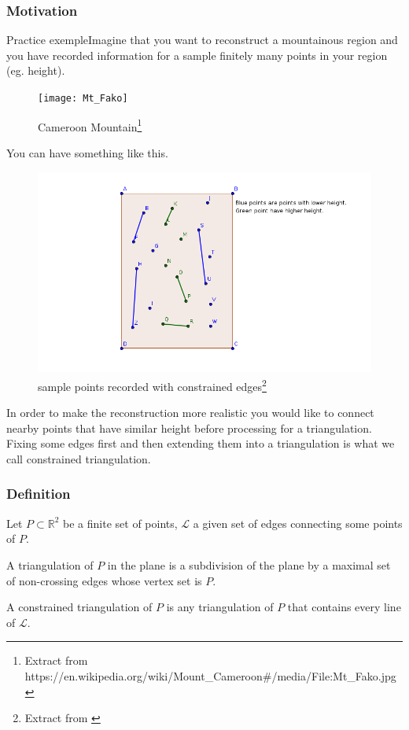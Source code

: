 \documentclass[10pt]{beamer}
\begin{document}
\begin{frame}
	\frametitle{Motivation}

\begin{block}{Practice exemple}Imagine that you want to reconstruct a mountainous region and you have recorded information for a sample finitely many points in your region (eg. height).\end{block}
		\begin{figure}[hH]\label{fig:mtfako}
			\centering
			\texttt{[image: Mt\_Fako]}
			\caption[Cameroon Mountain]{Cameroon Mountain\footnote{Extract from https://en.wikipedia.org/wiki/Mount\_Cameroon\#/media/File:Mt\_Fako.jpg}}%
	  		
		\end{figure}
\end{frame}
\begin{frame}
	You can have something like this.
	\begin{figure}[H]
		\centering
		\includegraphics[width=0.75\linewidth]{Sample}
		\caption[Sample points recorded]{sample points recorded with constrained edges\footnote{Extract from \cite{devadoss2011discrete}}}
		\label{fig:samplepoints}
	\end{figure}
	In order to make the reconstruction more realistic you would like to connect nearby points that have similar height before processing for a triangulation. Fixing some edges first and then extending them into a triangulation  is what we call constrained triangulation.
	
\end{frame}
\begin{frame}
	\frametitle{Definition}
	Let $P\subset\mathbb{R}^2$ be a finite set of points, $\mathcal{L}$ a given set of edges connecting some points of $P$.
	
	A {\color{blue}triangulation of $P$} in the plane is a subdivision of the plane by a maximal set of non-crossing edges whose vertex set is $P$.
	
	  A {\color{blue}constrained triangulation of $P$} is any triangulation of $P$ that contains every line of $\mathcal{L}$.
\end{frame}
\end{document}

